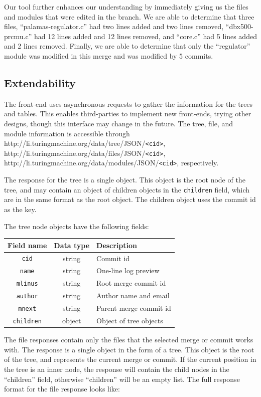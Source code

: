 \documentclass[conference, draftclsnofoot]{IEEEtran}
\begin{document}
Our tool further enhances our understanding by immediately giving us the files
and modules that were edited in the branch. We are able to determine that three
files, ``palamas-regulator.c'' had two lines added and two lines removed,
``dbx500-prcmu.c'' had 12 lines added and 12 lines removed, and ``core.c'' had 5
lines added and 2 lines removed. Finally, we are able to determine that only the
``regulator'' module was modified in this merge and was modified by 5 commits.

\subsection{Extendability}

The front-end uses asynchronous requests to gather the information for the trees and
tables. This enables third-parties to implement new front-ends, trying other
designs, though this interface may change in the future. The tree, file, and module
information is accessible through
http://li.turingmachine.org/data/tree/JSON/\verb|<cid>|,
http://li.turingmachine.org/data/files/JSON/\verb|<cid>|,
http://li.turingmachine.org/data/modules/JSON/\verb|<cid>|, respectively.

The response for the tree is a single object. This object is the root node of the
tree, and may contain an object of children objects in the \verb|children| field,
which are in the same format as the root object. The children object uses the commit
id as the key.

The tree node objects have the following fields:

\begin{tabular}{ccl}
        Field name      & Data type & Description\\\hline
        \verb|cid|      & string    & Commit id\\
        \verb|name|     & string    & One-line log preview\\
        \verb|mlinus|   & string    & Root merge commit id\\
        \verb|author|   & string    & Author name and email\\
        \verb|mnext|    & string    & Parent merge commit id\\
        \verb|children| & object    & Object of tree objects\\
\end{tabular}

The file responses contain only the files that the selected merge or commit works
with. The response is a single object in the form of a tree. This object is the root
of the tree, and represents the current merge or commit. If the current position in
the tree is an inner node, the response will contain the child nodes in the
``children'' field, otherwise ``children'' will be an empty list. The full response
format for the file response looks like:
\end{document}
